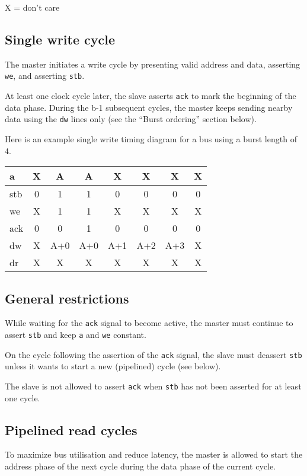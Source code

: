 \documentclass[a4paper,11pt]{article}
\begin{document}
X = don't care

\subsection{Single write cycle}
The master initiates a write cycle by presenting valid address and data, asserting \verb!we!, and asserting \verb!stb!.

At least one clock cycle later, the slave asserts \verb!ack! to mark the beginning of the data phase. During the b-1 subsequent cycles, the master keeps sending nearby data using the \verb!dw! lines only (see the ``Burst ordering'' section below).

Here is an example single write timing diagram for a bus using a burst length of 4.

\begin{tabular}{|l|c|c|c|c|c|c|c|}
\hline
a & X & A & A & X & X & X & X \\
\hline
stb & 0 & 1 & 1 & 0 & 0 & 0 & 0 \\
\hline
we & X & 1 & 1 & X & X & X & X \\
\hline
ack & 0 & 0 & 1 & 0 & 0 & 0 & 0 \\
\hline
dw & X & A+0 & A+0 & A+1 & A+2 & A+3 & X \\
\hline
dr & X & X & X & X & X & X & X \\
\hline
\end{tabular}

\subsection{General restrictions}
While waiting for the \verb!ack! signal to become active, the master must continue to assert \verb!stb! and keep \verb!a! and \verb!we! constant.

On the cycle following the assertion of the \verb!ack! signal, the slave must deassert \verb!stb! unless it wants to start a new (pipelined) cycle (see below).

The slave is not allowed to assert \verb!ack! when \verb!stb! has not been asserted for at least one cycle.

\subsection{Pipelined read cycles}
To maximize bus utilisation and reduce latency, the master is allowed to start the address phase of the next cycle during the data phase of the current cycle.
\end{document}
